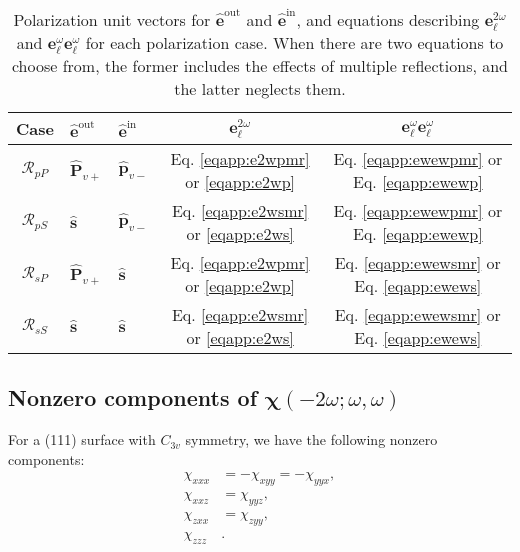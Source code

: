 \begin{table}[b]
\centering
\begin{tabular}{ | c l l | c | c | }
\hline
Case               & $\hat{\mathbf{e}}^{\mathrm{out}}$
                   & $\hat{\mathbf{e}}^{\mathrm{in}}$
                   & $\mathbf{e}^{2\omega}_{\ell}$
                   & $\mathbf{e}^{\omega}_{\ell}\mathbf{e}^{\omega}_{\ell}$ \\
\hline
$\mathcal{R}_{pP}$ & $\hat{\mathbf{P}}_{v+}$
                   & $\hat{\mathbf{p}}_{v-}$
                   &  Eq. \eqref{eqapp:e2wpmr} or \eqref{eqapp:e2wp}
                   & Eq. \eqref{eqapp:ewewpmr} or Eq. \eqref{eqapp:ewewp} \\
$\mathcal{R}_{pS}$ & $\hat{\mathbf{s}}$
                   & $\hat{\mathbf{p}}_{v-}$
                   &  Eq. \eqref{eqapp:e2wsmr} or \eqref{eqapp:e2ws}
                   & Eq. \eqref{eqapp:ewewpmr} or Eq. \eqref{eqapp:ewewp} \\
$\mathcal{R}_{sP}$ & $\hat{\mathbf{P}}_{v+}$
                   & $\hat{\mathbf{s}}$
                   &  Eq. \eqref{eqapp:e2wpmr} or \eqref{eqapp:e2wp}
                   & Eq. \eqref{eqapp:ewewsmr} or Eq. \eqref{eqapp:ewews} \\
$\mathcal{R}_{sS}$ & $\hat{\mathbf{s}}$
                   & $\hat{\mathbf{s}}$
                   &  Eq. \eqref{eqapp:e2wsmr} or \eqref{eqapp:e2ws}
                   & Eq. \eqref{eqapp:ewewsmr} or Eq. \eqref{eqapp:ewews} \\
\hline
\end{tabular}
\caption{Polarization unit vectors for $\hat{\mathbf{e}}^{\mathrm{out}}$ and
$\hat{\mathbf{e}}^{\mathrm{in}}$, and equations describing
$\mathbf{e}^{2\omega}_{\ell}$ and
$\mathbf{e}^{\omega}_{\ell}\mathbf{e}^{\omega}_{\ell}$ for each polarization
case. When there are two equations to choose from, the former includes the
effects of multiple reflections, and the latter neglects
them.\label{tab:review}}
\end{table}


\subsection{Nonzero components of \texorpdfstring{$\boldsymbol{\chi}(-2\omega;
\omega, \omega)$}{X(2w;-w,w)}}

For a (111) surface with $C_{3v}$ symmetry, we have the following nonzero
components: 
\begin{equation}\label{eqapp:nonzero111}
\begin{split}
\chi_{xxx}&=-\chi_{xyy}=-\chi_{yyx},\\
\chi_{xxz}&=\chi_{yyz},\\
\chi_{zxx}&=\chi_{zyy},\\
\chi_{zzz}&.
\end{split}
\end{equation}

